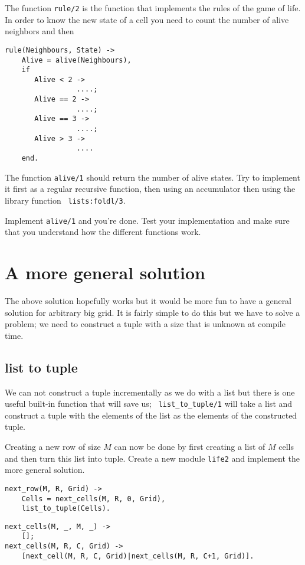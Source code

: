 \documentclass[a4paper,11pt]{article}
\begin{document}
The function {\tt rule/2} is the function that implements the rules
of the game of life. In order to know the new state of a cell you need
to count the number of alive neighbors and then 

\begin{verbatim}
rule(Neighbours, State) ->
    Alive = alive(Neighbours),
    if
       Alive < 2 -> 
                 ....;
       Alive == 2 -> 
                 ....;
       Alive == 3 -> 
                 ....;
       Alive > 3 -> 
                 ....
    end.
\end{verbatim}

The function {\tt alive/1} should return the number of alive
states. Try to implement it first as a regular recursive function,
then using an accumulator then using the library function {\tt
  lists:foldl/3}.

Implement {\tt alive/1} and you're done. Test your implementation and
make sure that you understand how the different functions work.

\section{A more general solution}

The above solution hopefully works but it would be more fun to have a
general solution for arbitrary big grid. It is fairly simple to do this
but we have to solve a problem; we need to construct a tuple with a
size that is unknown at compile time. 

\subsection{list to tuple}

We can not construct a tuple incrementally as we do with a list but
there is one useful built-in function that will save us; {\tt
  list\_to\_tuple/1} will take a list and construct a tuple with the
elements of the list as the elements of the constructed tuple.

Creating a new row of size $M$ can now be done by first creating a
list of $M$ cells and then turn this list into tuple. Create a new
module {\tt life2} and implement the more general solution.

\begin{verbatim}
next_row(M, R, Grid) ->
    Cells = next_cells(M, R, 0, Grid),
    list_to_tuple(Cells).
\end{verbatim}

\begin{verbatim}
next_cells(M, _, M, _) ->
    [];
next_cells(M, R, C, Grid) ->
    [next_cell(M, R, C, Grid)|next_cells(M, R, C+1, Grid)].
\end{verbatim}
\end{document}
